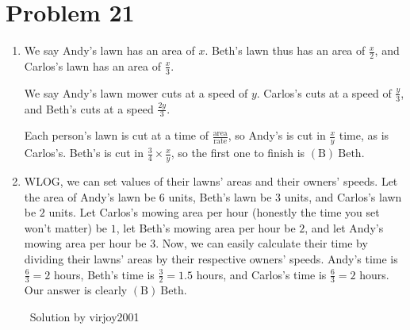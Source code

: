 \documentclass{article}%
\begin{document}
\section*{Problem 21}%
\label{sec:Problem21}%
\begin{enumerate}%
\item%
We say Andy's lawn has an area of $x$. Beth's lawn thus has an area of $\frac{x}{2}$, and Carlos's lawn has an area of $\frac{x}{3}$. 

We say Andy's lawn mower cuts at a speed of $y$. Carlos's cuts at a speed of $\frac{y}{3}$, and Beth's cuts at a speed $\frac{2y}{3}$.

Each person's lawn is cut at a time of $\frac{\text{area}}{\text{rate}}$, so Andy's is cut in $\frac{x}{y}$ time, as is Carlos's. Beth's is cut in $\frac{3}{4}\times\frac{x}{y}$, so the first one to finish is $\boxed{\mathrm{(B)}\ \text{Beth}}$.



%
\item%
WLOG, we can set values of their lawns' areas and their owners' speeds. Let the area of Andy's lawn be $6$ units, Beth's lawn be $3$ units, and Carlos's lawn be $2$ units. Let Carlos's mowing area per hour (honestly the time you set won't matter) be $1$, let Beth's mowing area per hour be $2$, and let Andy's mowing area per hour be $3$. Now, we can easily calculate their time  by dividing their lawns' areas by their respective owners' speeds. Andy's time is $\frac{6}{3} = 2$ hours, Beth's time is $\frac{3}{2} = 1.5$ hours, and Carlos's time is $\frac{6}{3} = 2$ hours. Our answer is clearly $\boxed{\mathrm{(B)}\ \text{Beth}}$.


~Solution by virjoy2001

%
\end{enumerate}

%
\end{document}
